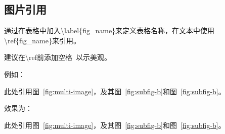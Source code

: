 \subsection{图片引用}

通过在表格中加入\textbackslash label\{fig\_name\}来定义表格名称，在文本中使用\textbackslash ref\{fig\_name\}来引用。

建议在\textbackslash ref前添加空格~以示美观。

例如：

\begin{python}
此处引用图~\ref{fig:multi-image}，及其图~\ref{fig:subfig-b}和图~\ref{fig:subfig-b}。
\end{python}

效果为：

此处引用图~\ref{fig:multi-image}，及其图~\ref{fig:subfig-b}和图~\ref{fig:subfig-b}。